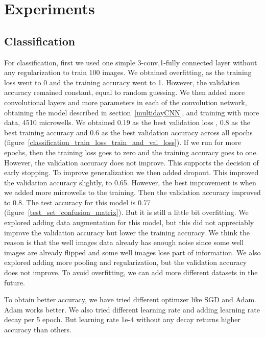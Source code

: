 \documentclass[10pt,twocolumn,letterpaper]{article}
\begin{document}
 \section{Experiments}
 
 \subsection{Classification}
 
For classification, first we used one simple 3-conv,1-fully connected layer without any regularization to train 100 images.  We obtained overfitting, as the training loss went to 0 and the training accuracy  went to 1. However, the validation accuracy remained constant, equal to random guessing.  We then added more convolutional layers and more parameters in each of the convolution network, obtaining the model described in section~\ref{multidayCNN},  and training with more data, 4510 microwells.  We obtained 0.19 as the best validation loss , 0.8 as the best training accuracy and 0.6 as the best validation accuracy across all epochs (figure~\ref{classification_train_loss_train_and_val_loss}).  If we run for more epochs, then the training loss goes to zero and the training accuracy goes to one.  However, the validation accuracy does not improve.  This supports the decision of early stopping.  To improve generalization we then added dropout.  This improved the validation accuracy slightly, to 0.65.
However, the best improvement is when we added more microwells to the training.  Then the validation accuracy improved to 0.8.  The test accuracy for this model is 0.77 (figure~\ref{test_set_confusion_matrix}). But it is still a little bit overfitting.
We explored adding data augmentation for this model, but this did not appreciably improve the validation accuracy but lower the training accuracy. We think the reason is that the well images data already has enough noise since some well images are already flipped and some well images lose part of information. We also explored adding more pooling and regularization, but the validation accuracy does not improve.
To avoid overfitting, we can add more different datasets in the future.

To obtain better accuracy, we have tried different optimzer like SGD and Adam. Adam works better. We also tried different learning rate and adding learning rate decay per 5 epoch. But learning rate 1e-4 without any decay returns higher accuracy than others. 
  
\end{document}
